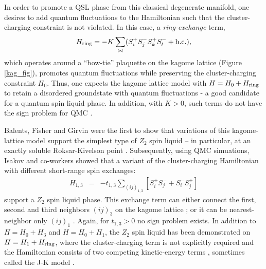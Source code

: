 \documentclass[range]{ar2e}
\begin{document}
In order to promote a QSL phase from this classical degenerate manifold, one desires to add quantum fluctuations to the Hamiltonian such that the cluster-charging constraint is not violated.  In this case, a {\it ring-exchange} term, 
\begin{eqnarray}
H_{\rm ring} = -K \sum_{\bowtie} ( S_i^{+} S_j^{-} S_k^{+} S_l^{-} + {\rm h.c.} ),
\end{eqnarray} 
which operates around a ``bow-tie'' plaquette on the kagome lattice (Figure \ref{kag_fig}),
promotes quantum fluctuations while preserving the cluster-charging constraint $H_0$.  Thus, one expects the kagome lattice model with $H = H_0 + H_{\rm ring}$ to retain a disordered groundstate with quantum fluctuations - a good candidate for a quantum spin liquid phase.  In addition, with $K>0$, such terms do not have the sign problem for QMC \cite{JKqmc}.

Balents, Fisher and Girvin \cite{BFG} were the first to show that variations of this kagome-lattice model support the simplest type of $Z_2$ spin liquid -- in particular, at an exactly soluble Roksar-Kivelson point \cite{Rokhsar88}.  Subsequently, using QMC simuations, Isakov and co-workers showed that a variant of the cluster-charging Hamiltonian with different short-range spin exchanges: 
\begin{eqnarray}
H_{1,3} &=& -t_{1,3} \sum_{( ij )_{1,3}} [S^{+}_i S^-_j + S^-_i S^{+}_j]  
\end{eqnarray}
support a $Z_2$ spin liquid phase.  This exchange term can either connect the first, second and third neighbors $( ij )_3$ on the kagome lattice \cite{Isakov1,Isakov2}; or it can be nearest-neighbor only $( ij )_1$ \cite{TopoEE}.  Again, for $t_{1,3}>0$ no sign problem exists. 
In addition to  $H = H_0 + H_3$ and $H = H_0 + H_1$, the $Z_2$ spin liquid has been demonstrated on $H = H_1 + H_{\rm ring}$, where the cluster-charging term is not explicitly required and the Hamiltonian consists of two competing kinetic-energy terms \cite{Long}, sometimes called the J-K model \cite{JKqmc}.
\end{document}
